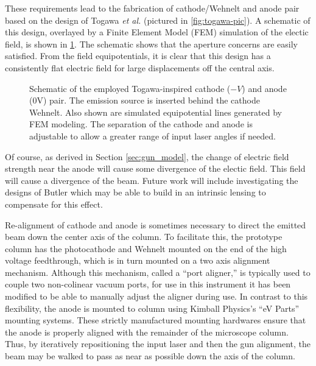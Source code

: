 These requirements lead to the fabrication of cathode/Wehnelt and anode pair based on the design of Togawa \textit{et al.} \cite{togawa_ceb6_2007} (pictured in \ref{fig:togawa-pic}).
A schematic of this design, overlayed by a Finite Element Model (FEM) simulation of the electic field, is shown in \ref{fig:gun-field}.
The schematic shows that the aperture concerns are easily satisfied.
From the field equipotentials, it is clear that this design has a consistently flat electric field for large displacements off the central axis.

\begin{figure}
  \centering
  
  \caption[Schematic of the employed Togawa-inspired custom cathode-anode pair]{
    Schematic of the employed Togawa-inspired cathode ($-V$) and anode (0V) pair.
    The emission source is inserted behind the cathode Wehnelt.
    Also shown are simulated equipotential lines generated by FEM modeling.
    The separation of the cathode and anode is adjustable to allow a greater range of input laser angles if needed. 
  }
  \label{fig:gun-field}
\end{figure}

Of course, as derived in Section \ref{sec:gun_model}, the change of electric field strength near the anode will cause some divergence of the electic field.
This field will cause a divergence of the beam.
Future work will include investigating the designs of Butler %
which may be able to build in an intrinsic lensing to compensate for this effect.


Re-alignment of cathode and anode is sometimes necessary to direct the emitted beam down the center axis of the column.
To facilitate this, the prototype column has the photocathode and Wehnelt mounted on the end of the high voltage feedthrough, which is in turn mounted on a two axis alignment mechanism.
Although this mechanism, called a ``port aligner,'' is typically used to couple two non-colinear vacuum ports, for use in this instrument it has been modified to be able to manually adjust the aligner during use.
In contrast to this flexibility, the anode is mounted to column using Kimball Physics's ``eV Parts'' mounting systems.
These strictly manufactured mounting hardwares ensure that the anode is properly aligned with the remainder of the microscope column.
Thus, by iteratively repositioning the input laser and then the gun alignment, the beam may be walked to pass as near as possible down the axis of the column.

